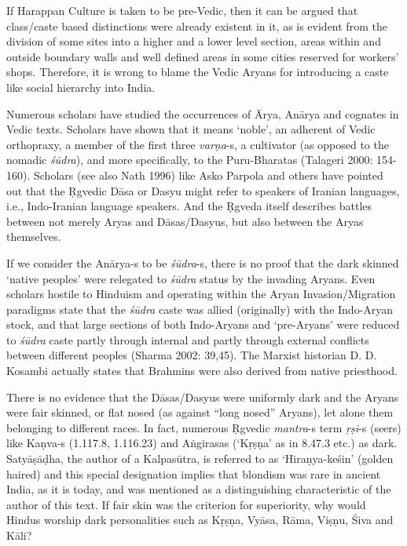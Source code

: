 If Harappan Culture is taken to be pre-Vedic, then it can be argued that class/caste based distinctions were already existent in it, as is evident from the division of some sites into a higher and a lower level section, areas within and outside boundary walls and well defined areas in some cities reserved for workers’ shops. Therefore, it is wrong to blame the Vedic Aryans for introducing a caste like social hierarchy into India.

Numerous scholars have studied the occurrences of Ārya, Anārya and cognates in Vedic texts. Scholars have shown that it means ‘noble’, an adherent of Vedic orthopraxy, a member of the first three \textit{varṇa}-s, a cultivator (as opposed to the nomadic \textit{śūdra}), and more specifically, to the Puru-Bharatas (Talageri 2000: 154-160). Scholars (see also Nath 1996) like Asko Parpola and others have pointed out that the Ṛgvedic Dāsa or Dasyu might refer to speakers of Iranian languages, i.e., Indo-Iranian language speakers. And the Ṛgveda itself describes battles between not merely Aryas and Dāsas/Dasyus, but also between the Aryas themselves.

If we consider the Anārya-s to be \textit{śūdra}-s, there is no proof that the dark skinned ‘native peoples’ were relegated to \textit{śūdra} status by the invading Aryans. Even scholars hostile to Hinduism and operating within the Aryan Invasion/Migration paradigms state that the \textit{śūdra} caste was allied (originally) with the Indo-Aryan stock, and that large sections of both Indo-Aryans and ‘pre-Aryans’ were reduced to \textit{śūdra} caste partly through internal and partly through external conflicts between different peoples (Sharma 2002: 39,45). The Marxist historian D. D. Kosambi actually states that Brahmins were also derived from native priesthood.

There is no evidence that the Dāsas/Dasyus were uniformly dark and the Aryans were fair skinned, or flat nosed (as against “long nosed” Aryans), let alone them belonging to different races. In fact, numerous Ṛgvedic \textit{mantra}-s term \textit{ṛṣi}-s (seers) like Kaṇva-s (1.117.8, 1.116.23) and Aṅgirasas (‘Kṛṣṇa’ as in 8.47.3 etc.) as dark. Satyāṣāḍha, the author of a Kalpasūtra, is referred to as ‘Hiraṇya-keśin’ (golden haired) and this special designation implies that blondism was rare in ancient India, as it is today, and was mentioned as a distinguishing characteristic of the author of this text. If fair skin was the criterion for superiority, why would Hindus worship dark personalities such as Kṛṣṇa, Vyāsa, Rāma, Viṣṇu, Śiva and Kāli?


